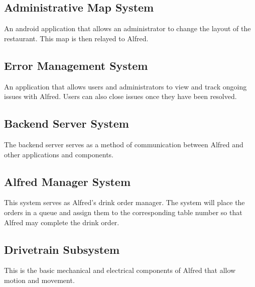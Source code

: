 \documentclass [10pt]{article}
\begin{document}
\subsection{Administrative Map System}
An android application that allows an administrator to change the layout of the restaurant. This map is then relayed to Alfred.

\subsection{Error Management System}
An application that allows users and administrators to view and track ongoing issues with Alfred. Users can also close issues once they have been resolved. 

\subsection{Backend Server System}
The backend server serves as a method of communication between Alfred and other applications and components.

\subsection{Alfred Manager System}
This system serves as Alfred's drink order manager. The system will place the orders in a queue and assign them to the corresponding table number so that Alfred may complete the drink order.

\subsection{Drivetrain Subsystem}
This is the basic mechanical and electrical components of Alfred that allow motion and movement. 

\end{document}
